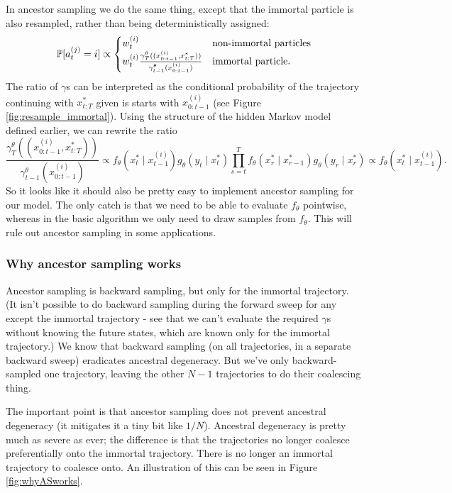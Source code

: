 In ancestor sampling we do the same thing, except that the immortal particle is also resampled, rather than being deterministically assigned:
\begin{equation}\label{eq:ancsamp_probs}
\mathbb{P}[a_t^{(j)} = i] \propto
\begin{cases}
w_t^{(i)} &\text{non-immortal particles}\\
w_t^{(i)} \frac{\gamma_T^\theta((x_{0:t-1}^{(i)}, x_{t:T}^*))}{\gamma_{t-1}^\theta(x_{0:t-1}^{(i)})} &\text{immortal particle} .
\end{cases}
\end{equation}
The ratio of $\gamma$s can be interpreted as the conditional probability of the trajectory continuing with $x_{t:T}^*$ given is starts with $x_{0:t-1}^{(i)}$ (see Figure \ref{fig:resample_immortal}).
Using the structure of the hidden Markov model defined earlier, we can rewrite the ratio
\begin{equation*}
\frac{\gamma_T^\theta((x_{0:t-1}^{(i)}, x_{t:T}^*))}{\gamma_{t-1}^\theta(x_{0:t-1}^{(i)})}
\propto f_\theta(x_t^* \mid x_{t-1}^{(i)}) g_\theta(y_t \mid x_t^*) \prod_{s=t}^T f_\theta(x_r^* \mid x_{r-1}^*) g_\theta(y_r \mid x_r^*)
\propto f_\theta(x_t^* \mid x_{t-1}^{(i)}) .
\end{equation*}
So it looks like it should also be pretty easy to implement ancestor sampling for our model. 
The only catch is that we need to be able to evaluate $f_\theta$ pointwise, whereas in the basic algorithm we only need to draw samples from $f_\theta$. This will rule out ancestor sampling in some applications.


\subsubsection{Why ancestor sampling works}

Ancestor sampling is backward sampling, but only for the immortal trajectory. (It isn't possible to do backward sampling during the forward sweep for any except the immortal trajectory - see that we can't evaluate the required $\gamma$s without knowing the future states, which are known only for the immortal trajectory.)
We know that backward sampling (on all trajectories, in a separate backward sweep) eradicates ancestral degeneracy. But we've only backward-sampled one trajectory, leaving the other $N-1$ trajectories to do their coalescing thing.

The important point is that ancestor sampling does not prevent ancestral degeneracy (it mitigates it a tiny bit like $1/N$). Ancestral degeneracy is pretty much as severe as ever; the difference is that the trajectories no longer coalesce preferentially onto the immortal trajectory. There is no longer an immortal trajectory to coalesce onto. An illustration of this can be seen in Figure \ref{fig:whyASworks}.

